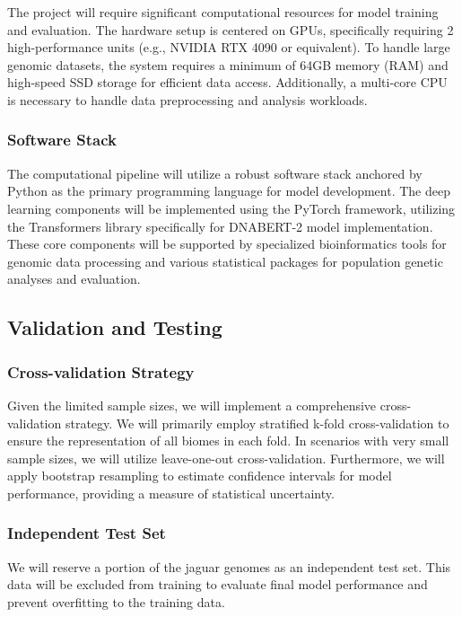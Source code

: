 The project will require significant computational resources for model training and evaluation. The hardware setup is centered on GPUs, specifically requiring 2 high-performance units (e.g., NVIDIA RTX 4090 or equivalent). To handle large genomic datasets, the system requires a minimum of 64GB memory (RAM) and high-speed SSD storage for efficient data access. Additionally, a multi-core CPU is necessary to handle data preprocessing and analysis workloads.

\subsubsection{Software Stack}

The computational pipeline will utilize a robust software stack anchored by Python as the primary programming language for model development. The deep learning components will be implemented using the PyTorch framework, utilizing the Transformers library specifically for DNABERT-2 model implementation. These core components will be supported by specialized bioinformatics tools for genomic data processing and various statistical packages for population genetic analyses and evaluation.

\subsection{Validation and Testing}

\subsubsection{Cross-validation Strategy}

Given the limited sample sizes, we will implement a comprehensive cross-validation strategy. We will primarily employ stratified k-fold cross-validation to ensure the representation of all biomes in each fold. In scenarios with very small sample sizes, we will utilize leave-one-out cross-validation. Furthermore, we will apply bootstrap resampling to estimate confidence intervals for model performance, providing a measure of statistical uncertainty.

\subsubsection{Independent Test Set}

We will reserve a portion of the jaguar genomes as an independent test set. This data will be excluded from training to evaluate final model performance and prevent overfitting to the training data.

